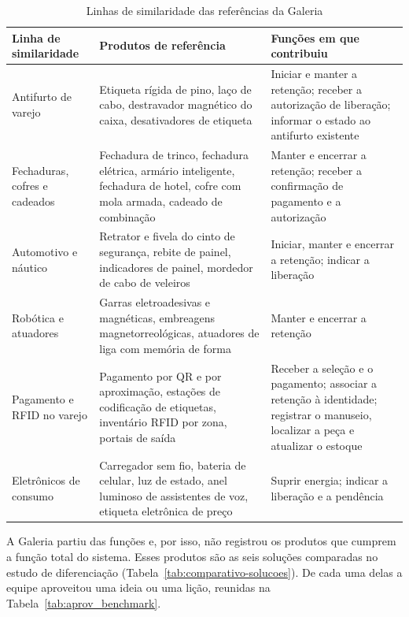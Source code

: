 \begin{table}[htbp]
    \centering
    \caption{Linhas de similaridade das referências da Galeria}
    \label{tab:aprov_linhas}
    \footnotesize
    \renewcommand{\arraystretch}{1.3}
    \begin{tabularx}{\textwidth}{@{}
        >{\RaggedRight\arraybackslash}p{3.0cm}
        >{\RaggedRight\arraybackslash}X
        >{\RaggedRight\arraybackslash}X@{}}
        \toprule
        \textbf{Linha de similaridade} & \textbf{Produtos de referência} & \textbf{Funções em que contribuiu} \\
        \midrule
        Antifurto de varejo & Etiqueta rígida de pino, laço de cabo, destravador magnético do caixa, desativadores de etiqueta & Iniciar e manter a retenção; receber a autorização de liberação; informar o estado ao antifurto existente \\
        Fechaduras, cofres e cadeados & Fechadura de trinco, fechadura elétrica, armário inteligente, fechadura de hotel, cofre com mola armada, cadeado de combinação & Manter e encerrar a retenção; receber a confirmação de pagamento e a autorização \\
        Automotivo e náutico & Retrator e fivela do cinto de segurança, rebite de painel, indicadores de painel, mordedor de cabo de veleiros & Iniciar, manter e encerrar a retenção; indicar a liberação \\
        Robótica e atuadores & Garras eletroadesivas e magnéticas, embreagens magnetorreológicas, atuadores de liga com memória de forma & Manter e encerrar a retenção \\
        Pagamento e RFID no varejo & Pagamento por QR e por aproximação, estações de codificação de etiquetas, inventário RFID por zona, portais de saída & Receber a seleção e o pagamento; associar a retenção à identidade; registrar o manuseio, localizar a peça e atualizar o estoque \\
        Eletrônicos de consumo & Carregador sem fio, bateria de celular, luz de estado, anel luminoso de assistentes de voz, etiqueta eletrônica de preço & Suprir energia; indicar a liberação e a pendência \\
        \bottomrule
    \end{tabularx}
\end{table}

A Galeria partiu das funções e, por isso, não registrou os produtos que cumprem a função total do sistema. Esses produtos são as seis soluções comparadas no estudo de diferenciação (Tabela~\ref{tab:comparativo-solucoes}). De cada uma delas a equipe aproveitou uma ideia ou uma lição, reunidas na Tabela~\ref{tab:aprov_benchmark}.

